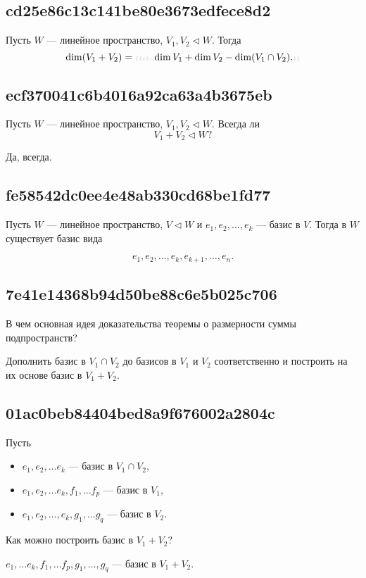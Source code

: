 \documentclass[11pt, a5paper]{article}
\newenvironment{note}[1]{\goodbreak\par\subsection{\hfill \color{lightgray}\tiny #1}}{}
\newenvironment{cloze}[2][\ldots]{\begin{leftbar}}{\end{leftbar}}
\newenvironment{icloze}[2][\ldots]{%
  \ignorespaces\text{\tiny \color{lightgray} \{\{c#2::}\hspace{0pt}%
}{%
  \hspace{0pt}\text{\tiny \color{lightgray}\}\}}\unskip%
}
\begin{document}
\begin{note}{cd25e86c13c141be80e3673edfece8d2}
    Пусть \( W \) --- линейное пространство, \( V_1, V_2 \triangleleft W \).
    Тогда
    \[
        \dim (V_1 + V_2) = \begin{icloze}{1}\dim V_1 + \dim V_2 - \dim (V_1 \cap V_2).\end{icloze}
    \]
\end{note}

\begin{note}{ecf370041c6b4016a92ca63a4b3675eb}
    Пусть \( W \) --- линейное пространство, \( V_1, V_2 \triangleleft W \).
    Всегда ли
    \[
        V_1 + V_2 \triangleleft W?
    \]

    \begin{cloze}{1}
        Да, всегда.
    \end{cloze}
\end{note}

\begin{note}{fe58542dc0ee4e48ab330cd68be1fd77}
    Пусть \( W \) --- линейное пространство, \( V \triangleleft W \) и \( e_1, e_2, \ldots, e_k  \)  --- \begin{icloze}{2}базис в \( V. \)\end{icloze}
    Тогда в \( W \) существует базис вида \begin{icloze}{1}
        \[
            e_1, e_2, \ldots, e_k, e_{k + 1}, \ldots, e_n.
        \]
    \end{icloze}
\end{note}

\begin{note}{7e41e14368b94d50be88c6e5b025c706}
    В чем основная идея доказательства теоремы о размерности суммы подпространств?

    \begin{cloze}{1}
        Дополнить базис в \( V_1 \cap V_2 \) до базисов в \( V_1 \) и \( V_2 \) соответственно и построить на их основе базис в \( V_1 + V_2 \).
    \end{cloze}
\end{note}

\begin{note}{01ac0beb84404bed8a9f676002a2804c}
    Пусть
    \begin{itemize}
        \item \( e_1,e_2,\ldots e_k \) --- базис в \( V_1 \cap V_2 \),
        \item \( e_1,e_2,\ldots e_k, f_1,\ldots f_p \) --- базис в \( V_1 \),
        \item \( e_1,e_2,\ldots, e_k, g_1,\ldots g_q \) --- базис в \( V_2 \).
    \end{itemize}
    Как можно построить базис в \( V_1 + V_2 \)?

    \begin{cloze}{1}
        \( e_1,\ldots e_k, f_1,\ldots f_p, g_1,\ldots, g_q \) --- базис в \( V_1 + V_2 \).
    \end{cloze}
\end{note}
\end{document}
